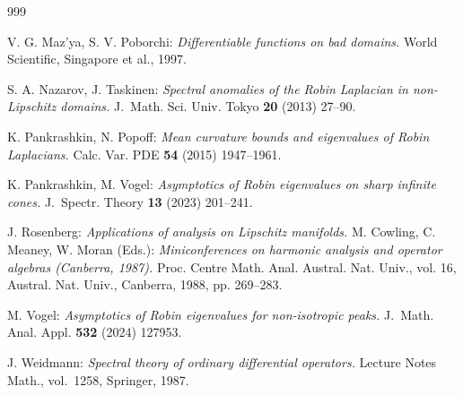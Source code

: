 \documentclass[11pt,oneside,reqno,a4paper]{amsart}
\theoremstyle{definition}
\begin{document}
\begin{thebibliography}{999}
				
		V. G. Maz'ya, S. V. Poborchi: \emph{Differentiable functions on bad domains.} %
		World Scientific, Singapore et al., 1997.

		 S. A. Nazarov, J. Taskinen: \emph{Spectral anomalies of the Robin Laplacian in non-Lip\-schitz domains.} J.~Math. Sci. Univ. Tokyo {\bf 20} (2013) 27--90.
		
		K. Pankrashkin, N. Popoff: \emph{Mean curvature bounds and eigenvalues of Robin Laplacians.}
		Calc. Var. PDE {\bf 54} (2015) 1947--1961.
		
		
		K. Pankrashkin, M. Vogel: \emph{Asymptotics of Robin eigenvalues on sharp infinite cones.} J.~Spectr. Theory {\bf 13} (2023) 201--241. %
		
		 J. Rosenberg: \emph{Applications of analysis on Lipschitz manifolds.} M. Cowling,
		C. Meaney, W. Moran (Eds.): \emph{Miniconferences on harmonic analysis and operator
		algebras (Canberra, 1987).} Proc. Centre Math. Anal. Austral. Nat. Univ., vol. 16,
		Austral. Nat. Univ., Canberra, 1988, pp. 269–283.
		
		 M. Vogel: \emph{Asymptotics of Robin eigenvalues for non-isotropic peaks.}
		J.~Math. Anal. Appl. {\bf 532} (2024) 127953.
		
		 J. Weidmann: \emph{Spectral theory of ordinary differential operators.} Lecture Notes Math., vol.~1258, Springer, 1987.
		
	\end{thebibliography}
	
\end{document}
